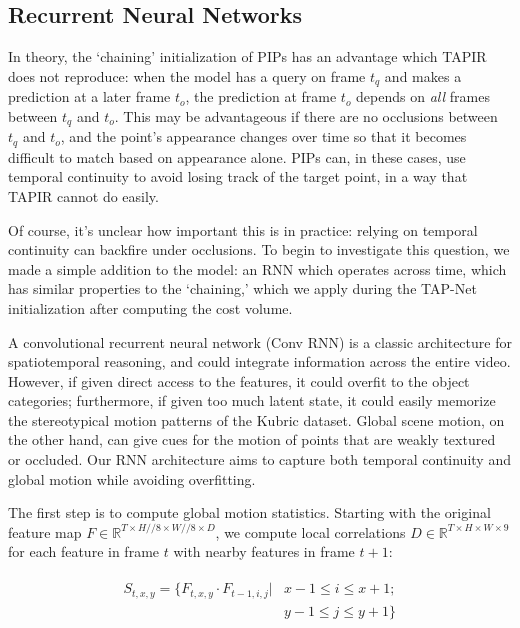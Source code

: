\documentclass[10pt,twocolumn,letterpaper]{article}
\begin{document}
\subsection{Recurrent Neural Networks}
In theory, the `chaining' initialization of PIPs has an advantage which TAPIR does not reproduce: when the model has a query on frame $t_q$ and makes a prediction at a later frame $t_o$, the prediction at frame $t_o$ depends on \textit{all} frames between $t_q$ and $t_o$.  This may be advantageous if there are no occlusions between $t_q$ and $t_o$, and the point's appearance changes over time so that it becomes difficult to match based on appearance alone.  PIPs can, in these cases, use temporal continuity to avoid losing track of the target point, in a way that TAPIR cannot do easily.

Of course, it's unclear how important this is in practice: relying on temporal continuity can backfire under occlusions.  To begin to investigate this question, we made a simple addition to the model: an RNN which operates across time, which has similar properties to the `chaining,' which we apply during the TAP-Net initialization after computing the cost volume.

A convolutional recurrent neural network (Conv RNN) is a classic architecture for spatiotemporal reasoning, and could integrate information across the entire video.  However, if given direct access to the features, it could overfit to the object categories; furthermore, if given too much latent state, it could easily memorize the stereotypical motion patterns of the Kubric dataset.  Global scene motion, on the other hand, can give cues for the motion of points that are weakly textured or occluded.  Our RNN architecture aims to capture both temporal continuity and global motion while avoiding overfitting.

The first step is to compute global motion statistics.  Starting with the original feature map $F\in{\mathbb{R}^{T\times H//8\times W//8\times D}}$, we compute local correlations $D\in{\mathbb{R}^{T\times H\times W\times 9}}$ for each feature in frame $t$ with nearby features in frame $t+1$:

\begin{align}
\begin{split}
S_{t,x,y}=\{F_{t,x,y}\cdot F_{t-1,i,j}| & x-1\leq i \leq x+1; \\
                                             & y-1\leq j \leq y+1\}
\end{split}
\end{align}
\end{document}
